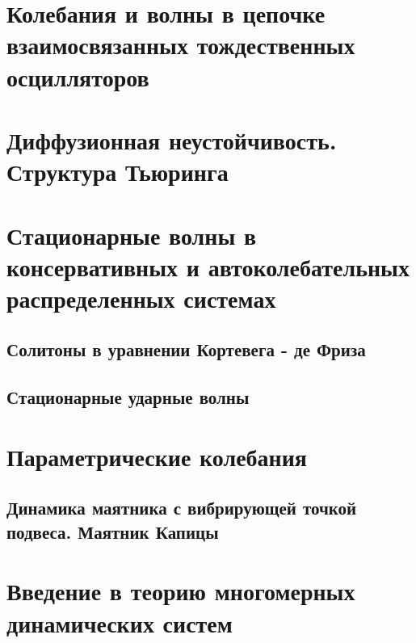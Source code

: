 \documentclass[a4paper,14pt]{extarticle}
\theoremstyle{definition}
\begin{document}


\newpage
\tableofcontents 

\newpage
\section{Колебания и волны в цепочке взаимосвязанных тождественных осцилляторов}
\label{sec:vibrations_and_wave_in_ordered_struct}
	

\newpage
\section{Диффузионная неустойчивость. Структура Тьюринга}
\label{sec:diffusion_instability}
	



\newpage
\section{Стационарные волны в консервативных и автоколебательных распределенных системах}
\label{sec:volnu}
	\subsection{Солитоны в уравнении Кортевега - де Фриза}
	\label{ssec:soliton}
		

	\subsection{Стационарные ударные волны}
	\label{ssec:shock_waves}
		

\newpage
\section{Параметрические колебания}
\label{sec:parametric_oscillations}
	
	
	\subsection{Динамика маятника с вибрирующей точкой подвеса. Маятник Капицы}
	\label{ssec:kap_pendulum}
		

\newpage
\section{Введение в теорию многомерных динамических систем}
\label{sec:multidimensional_dynamic_systems}
	
\end{document}
